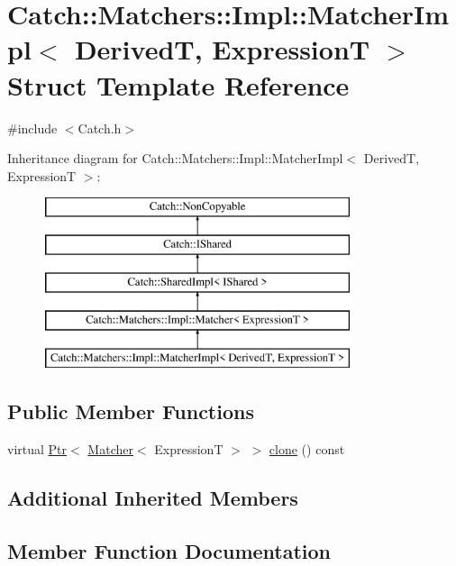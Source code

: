 \hypertarget{struct_catch_1_1_matchers_1_1_impl_1_1_matcher_impl}{}\section{Catch\+:\+:Matchers\+:\+:Impl\+:\+:Matcher\+Impl$<$ DerivedT, ExpressionT $>$ Struct Template Reference}
\label{struct_catch_1_1_matchers_1_1_impl_1_1_matcher_impl}


{\ttfamily \#include $<$Catch.\+h$>$}

Inheritance diagram for Catch\+:\+:Matchers\+:\+:Impl\+:\+:Matcher\+Impl$<$ DerivedT, ExpressionT $>$\+:\begin{figure}[H]
\begin{center}
\leavevmode
\includegraphics[height=5.000000cm]{struct_catch_1_1_matchers_1_1_impl_1_1_matcher_impl}
\end{center}
\end{figure}
\subsection*{Public Member Functions}
\begin{DoxyCompactItemize}
\item 
virtual \hyperlink{class_catch_1_1_ptr}{Ptr}$<$ \hyperlink{struct_catch_1_1_matchers_1_1_impl_1_1_matcher}{Matcher}$<$ ExpressionT $>$ $>$ \hyperlink{struct_catch_1_1_matchers_1_1_impl_1_1_matcher_impl_afe2e10779f91394f80ff5c894fb1bfab}{clone} () const 
\end{DoxyCompactItemize}
\subsection*{Additional Inherited Members}


\subsection{Member Function Documentation}
